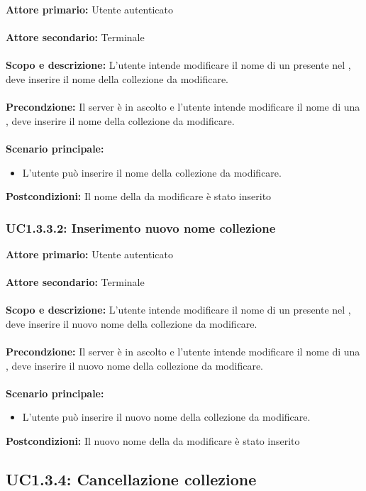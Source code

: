 \documentclass{scalatekids-article}
\begin{document}
\textbf{Attore primario:} Utente autenticato\\ \\
\textbf{Attore secondario:} Terminale\\ \\
\textbf{Scopo e descrizione:} L'utente intende modificare il nome di un  presente nel , deve inserire il nome della collezione da modificare.\\ \\
\textbf{Precondzione:} Il server è in ascolto e l'utente intende modificare il nome di una , deve inserire il nome della collezione da modificare.\\ \\
\textbf{Scenario principale:}
\begin{itemize}
  \item L'utente può inserire il nome della collezione da modificare.
\end{itemize}
\textbf{Postcondizioni:} Il nome della  da modificare è stato inserito

\subsubsection{UC1.3.3.2: Inserimento nuovo nome collezione}

\textbf{Attore primario:} Utente autenticato\\ \\
\textbf{Attore secondario:} Terminale\\ \\
\textbf{Scopo e descrizione:} L'utente intende modificare il nome di un  presente nel , deve inserire il nuovo nome della collezione da modificare.\\ \\
\textbf{Precondzione:} Il server è in ascolto e l'utente intende modificare il nome di una , deve inserire il nuovo nome della collezione da modificare.\\ \\
\textbf{Scenario principale:}
\begin{itemize}
  \item L'utente può inserire il nuovo nome della collezione da modificare.
\end{itemize}
\textbf{Postcondizioni:} Il nuovo nome della  da modificare è stato inserito

\subsection{UC1.3.4: Cancellazione collezione}
\end{document}

